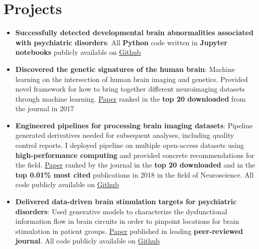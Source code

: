 \documentclass[letterpaper,10pt]{article}
\newcommand{\resumeItem}[2]{
  \item\small{
    \textbf{#1}{: #2 \vspace{-2pt}}
  }
}
\newcommand{\resumeSubItem}[2]{\resumeItem{#1}{#2}\vspace{-4pt}}
\newcommand{\resumeSubHeadingListStart}{\begin{itemize}[leftmargin=*]}
\newcommand{\resumeSubHeadingListEnd}{\end{itemize}}
\begin{document}
\section{Projects}
  \resumeSubHeadingListStart
    \resumeSubItem{Successfully detected developmental brain abnormalities associated with psychiatric disorders}
      {All \textbf{Python} code written in \textbf{Jupyter notebooks} publicly available on \href{https://github.com/lindenmp/NormativeNeuroDev_CrossSec}{\underline{Github}}}
      \newline
    \resumeSubItem{Discovered the genetic signatures of the human brain}
      {Machine learning on the intersection of human brain imaging and genetics. Provided novel framework for how to bring together different neuroimaging datasets through machine learning. \href{https://onlinelibrary.wiley.com/doi/full/10.1111/gbb.12386}{\underline{Paper}} ranked in the \textbf{top 20 downloaded} from the journal in 2017}
      \newline
    \resumeSubItem{Engineered pipelines for processing brain imaging datasets}
      {Pipeline generated derivatives needed for subsequent analyses, including quality control reports. I deployed pipeline on multiple open-access datasets using \textbf{high-performance computing} and provided concrete recommendations for the field. \href{https://www.sciencedirect.com/science/article/pii/S1053811917310972}{\underline{Paper}} ranked by the journal in the \textbf{top 20 downloaded} and in the \textbf{top 0.01\% most cited} publications in 2018 in the field of Neuroscience. All code publicly available on \href{https://github.com/lindenmp/rs-fMRI}{\underline{Github}}}
      \newline
    \resumeSubItem{Delivered data-driven brain stimulation targets for psychiatric disorders}
      {Used generative models to characterize the dysfunctional information flow in brain circuits in order to pinpoint locations for brain stimulation in patient groups. \href{https://www.sciencedirect.com/science/article/pii/S1053811919306585}{\underline{Paper}} published in leading \textbf{peer-reviewed journal}. All code publicly available on \href{https://github.com/lindenmp/rs-fMRI/tree/master/stats/spDCM}{\underline{Github}}}
  \resumeSubHeadingListEnd
\end{document}
